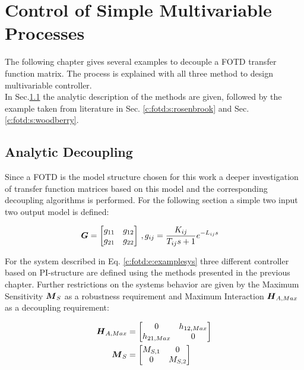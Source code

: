 \chapter{Control of Simple Multivariable Processes}
\label{c:fotd}

The following chapter gives several examples to decouple a FOTD transfer function matrix. The process is explained with all three method to design multivariable controller. \\

In Sec.\ref{c:fotd:s:analytic} the analytic description of the methods are given, followed by the example taken from literature in Sec. \ref{c:fotd:s:rosenbrook} and Sec.\ref{c:fotd:s:woodberry}.\\

\section{Analytic Decoupling}
\label{c:fotd:s:analytic}

Since a FOTD is the model structure chosen for this work a deeper investigation of transfer function matrices based on this model and the corresponding decoupling algorithms is performed. For the following section a simple two input two output model is defined:

\begin{align}
\begin{split}
\mbox{\boldmath$G$} = \begin{bmatrix}
g_{11} & g_{12} \\
g_{21} & g_{22}
\end{bmatrix} & ~,g_{ij} = \frac{K_{ij}}{T_{ij} s +1 } e^{-L_{ij}s}
\end{split}
\label{c:fotd:e:examplesys}
\end{align}

For the system described in Eq. \ref{c:fotd:e:examplesys} three different controller based on PI-structure are defined using the methods presented in the previous chapter. Further restrictions on the systems behavior are given by the Maximum Sensitivity $\mbox{\boldmath$M$}_S$ as a robustness requirement and Maximum Interaction $\mbox{\boldmath$H$}_{A,Max}$ as a decoupling requirement:

\begin{align}
\begin{split}
\mbox{\boldmath$H$}_{A,Max} &= \begin{bmatrix}
0 & h_{12,Max} \\
h_{21,Max} & 0 
\end{bmatrix}\\
\mbox{\boldmath$M$}_{S} &= \begin{bmatrix}
M_{S,1} & 0 \\
0 & M_{S,2}
\end{bmatrix}
\end{split}
\label{c:fotd:e:restrictions}
\end{align}

